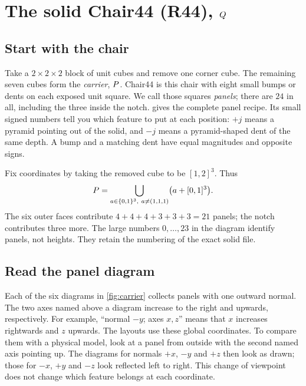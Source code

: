 \section{The solid Chair44 (R44), \texorpdfstring{$Q$}{Q}}\label{sec:solid}

\subsection{Start with the chair}

Take a $2\times2\times2$ block of unit cubes and remove one corner cube.
The remaining seven cubes form the \emph{carrier}, $P$. Chair44 is this
chair with eight small bumps or dents on each exposed unit square. We call those
squares \emph{panels}; there are $24$ in all, including the three inside the notch.
 gives the complete panel recipe. Its small signed numbers tell
you which feature to put at each position: $+j$ means a pyramid pointing out of
the solid, and $-j$ means a pyramid-shaped dent of the same depth. A bump and a
matching dent have equal magnitudes and opposite signs.

Fix coordinates by taking the removed cube to be $[1,2]^3$. Thus
\[
  \carrier=\bigcup_{a\in\{0,1\}^3,\ a\ne(1,1,1)}\bigl(a+[0,1]^3\bigr).
\]
The six outer faces contribute $4+4+4+3+3+3=21$ panels; the notch contributes
three more. The large numbers $0,\ldots,23$ in the diagram identify panels,
not heights. They retain the numbering of the exact solid file.

\subsection{Read the panel diagram}

Each of the six diagrams in \cref{fig:carrier} collects panels with one outward
normal. The two axes named above a diagram increase to the right and upwards,
respectively. For example, ``normal $-y$; axes $x,z$'' means that $x$ increases
rightwards and $z$ upwards. The layouts use these global coordinates. To compare
them with a physical model, look at a panel from outside with the second named
axis pointing up. The diagrams for normals $+x$, $-y$ and $+z$ then look as drawn;
those for $-x$, $+y$ and $-z$ look reflected left to right. This change of viewpoint
does not change which feature belongs at each coordinate.


